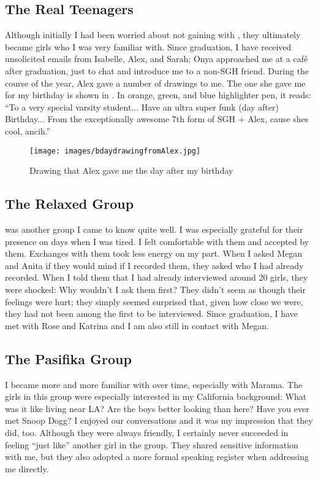 \subsection{The Real Teenagers}
Although initially I had been worried about not gaining  with , they ultimately became girls who I was very familiar with. Since graduation, I have received unsolicited emails from Isabelle, Alex, and Sarah; Onya approached me at a caf\'e after graduation, just to chat and introduce me to a non-SGH friend. During the course of the year, Alex gave a number of drawings to me. The one she gave me for my birthday is shown in . In orange, green, and blue highlighter pen, it reads: ``To a very special varsity student... Have an ultra super funk (day after) Birthday... From the exceptionally awesome 7th form of SGH + Alex, cause shes cool, ancih.''


\begin{figure}
	\centering
		\texttt{[image: images/bdaydrawingfromAlex.jpg]}
	\caption{Drawing that Alex gave me the day after my birthday}
	\label{fig:bdaydrawing}
\end{figure}


\subsection{The Relaxed Group}
 was another group I came to know quite well. I was especially grateful for their presence on days when I was tired. I felt comfortable with them and accepted by them. Exchanges with them took less energy on my part. When I asked Megan and Anita if they would mind if I recorded them, they asked who I had already recorded. When I told them that I had already interviewed around 20 girls, they were shocked: Why wouldn't I ask them first?  They didn't seem as though their feelings were hurt; they simply seemed surprised that, given how close we were, they had not been among the first to be interviewed. Since graduation, I have met with Rose and Katrina and I am also still in contact with Megan.

\subsection{The Pasifika Group}
I became more and more familiar with  over time, especially with Marama. The girls in this group were especially interested in my California background: What was it like living near LA?  Are the boys better looking than here?  Have you ever met Snoop Dogg?  I enjoyed our conversations and it was my impression that they did, too. Although they were always friendly, I certainly never succeeded in feeling ``just like'' another girl in the group. They shared sensitive information with me, but they also adopted a more formal speaking register when addressing me directly. 

